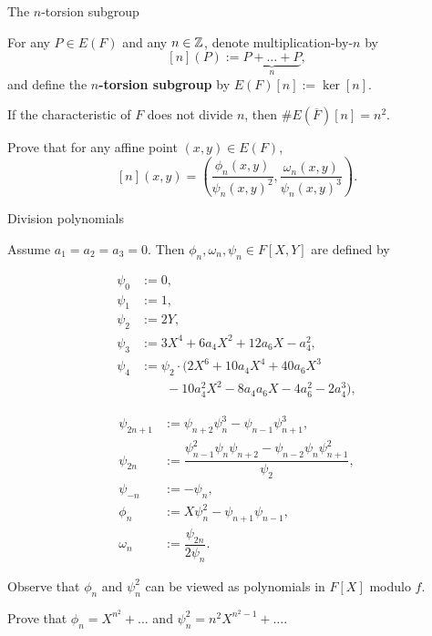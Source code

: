 \begin{frame}{The $ n $-torsion subgroup}

For any $ P \in E(F) $ and any $ n \in \mathbb{Z} $, denote multiplication-by-$ n $ by
$$ [n](P) := \underbrace{P + \dots + P}_n, $$
and define the \textbf{$ n $-torsion subgroup} by $ E(F)[n] := \ker[n] $.

\begin{formalisation}[A.--Xu, 2024]
If the characteristic of $ F $ does not divide $ n $, then $ \#E(\overline{F})[n] = n^2 $.
\end{formalisation}

\begin{exercise}
Prove that for any affine point $ (x, y) \in E(F) $,
$$ [n](x, y) = \left(\dfrac{\phi_n(x, y)}{\psi_n(x, y)^2}, \dfrac{\omega_n(x, y)}{\psi_n(x, y)^3}\right). $$
\end{exercise}

\end{frame}

\begin{frame}{Division polynomials}

Assume $ a_1 = a_2 = a_3 = 0 $. Then $ \phi_n, \omega_n, \psi_n \in F[X, Y] $ are defined by

{\footnotesize
\begin{minipage}{0.5\textwidth}
\begin{align*}
\psi_0 & := 0, \\
\psi_1 & := 1, \\
\psi_2 & := 2Y, \\
\psi_3 & := 3X^4 + 6a_4X^2 + 12a_6X - a_4^2, \\
\psi_4 & := \psi_2 \cdot (2X^6 + 10a_4X^4 + 40a_6X^3 \\
& \qquad - 10a_4^2X^2 - 8a_4a_6X - 4a_6^2 - 2a_4^3),
\end{align*}
\end{minipage}
\begin{minipage}{0.49\textwidth}
\begin{align*}
\psi_{2n + 1} & := \psi_{n + 2}\psi_n^3 - \psi_{n - 1}\psi_{n + 1}^3, \\
\psi_{2n} & := \dfrac{\psi_{n - 1}^2\psi_n\psi_{n + 2} - \psi_{n - 2}\psi_n\psi_{n + 1}^2}{\psi_2}, \\
\psi_{-n} & := -\psi_n, \\
\phi_n & := X\psi_n^2 - \psi_{n + 1}\psi_{n - 1}, \\
\omega_n & := \dfrac{\psi_{2n}}{2\psi_n}.
\end{align*}
\end{minipage}
}

\bigskip Observe that $ \phi_n $ and $ \psi_n^2 $ can be viewed as polynomials in $ F[X] $ modulo $ f $.

\begin{exercise}
Prove that $ \phi_n = X^{n^2} + \dots $ and $ \psi_n^2 = n^2X^{n^2 - 1} + \dots $.
\end{exercise}

\end{frame}

